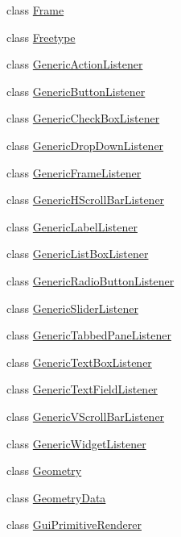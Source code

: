 \begin{DoxyCompactItemize}
class \mbox{\hyperlink{classec_1_1_frame}{Frame}}
\item 
class \mbox{\hyperlink{classec_1_1_freetype}{Freetype}}
\item 
class \mbox{\hyperlink{classec_1_1_generic_action_listener}{Generic\+Action\+Listener}}
\item 
class \mbox{\hyperlink{classec_1_1_generic_button_listener}{Generic\+Button\+Listener}}
\item 
class \mbox{\hyperlink{classec_1_1_generic_check_box_listener}{Generic\+Check\+Box\+Listener}}
\item 
class \mbox{\hyperlink{classec_1_1_generic_drop_down_listener}{Generic\+Drop\+Down\+Listener}}
\item 
class \mbox{\hyperlink{classec_1_1_generic_frame_listener}{Generic\+Frame\+Listener}}
\item 
class \mbox{\hyperlink{classec_1_1_generic_h_scroll_bar_listener}{Generic\+H\+Scroll\+Bar\+Listener}}
\item 
class \mbox{\hyperlink{classec_1_1_generic_label_listener}{Generic\+Label\+Listener}}
\item 
class \mbox{\hyperlink{classec_1_1_generic_list_box_listener}{Generic\+List\+Box\+Listener}}
\item 
class \mbox{\hyperlink{classec_1_1_generic_radio_button_listener}{Generic\+Radio\+Button\+Listener}}
\item 
class \mbox{\hyperlink{classec_1_1_generic_slider_listener}{Generic\+Slider\+Listener}}
\item 
class \mbox{\hyperlink{classec_1_1_generic_tabbed_pane_listener}{Generic\+Tabbed\+Pane\+Listener}}
\item 
class \mbox{\hyperlink{classec_1_1_generic_text_box_listener}{Generic\+Text\+Box\+Listener}}
\item 
class \mbox{\hyperlink{classec_1_1_generic_text_field_listener}{Generic\+Text\+Field\+Listener}}
\item 
class \mbox{\hyperlink{classec_1_1_generic_v_scroll_bar_listener}{Generic\+V\+Scroll\+Bar\+Listener}}
\item 
class \mbox{\hyperlink{classec_1_1_generic_widget_listener}{Generic\+Widget\+Listener}}
\item 
class \mbox{\hyperlink{classec_1_1_geometry}{Geometry}}
\item 
class \mbox{\hyperlink{classec_1_1_geometry_data}{Geometry\+Data}}
\item 
class \mbox{\hyperlink{classec_1_1_gui_primitive_renderer}{Gui\+Primitive\+Renderer}}

\end{DoxyCompactItemize}
